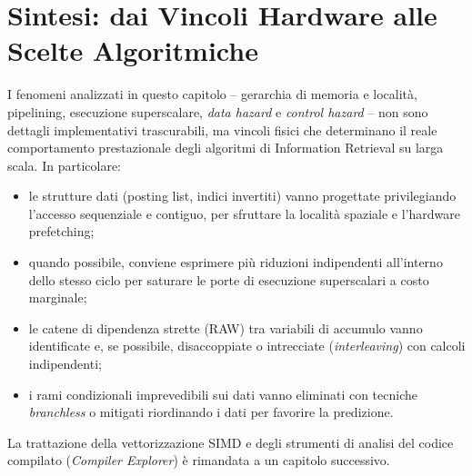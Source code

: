 \FloatBarrier
\section{Sintesi: dai Vincoli Hardware alle Scelte Algoritmiche}

I fenomeni analizzati in questo capitolo -- gerarchia di memoria e localit\`a, pipelining, esecuzione superscalare, \textit{data hazard} e \textit{control hazard} -- non sono dettagli implementativi trascurabili, ma vincoli fisici che determinano il reale comportamento prestazionale degli algoritmi di Information Retrieval su larga scala. In particolare:

\begin{itemize}
    \item le strutture dati (posting list, indici invertiti) vanno progettate privilegiando l'accesso sequenziale e contiguo, per sfruttare la localit\`a spaziale e l'hardware prefetching;
    \item quando possibile, conviene esprimere pi\`u riduzioni indipendenti all'interno dello stesso ciclo per saturare le porte di esecuzione superscalari a costo marginale;
    \item le catene di dipendenza strette (RAW) tra variabili di accumulo vanno identificate e, se possibile, disaccoppiate o intrecciate (\textit{interleaving}) con calcoli indipendenti;
    \item i rami condizionali imprevedibili sui dati vanno eliminati con tecniche \textit{branchless} o mitigati riordinando i dati per favorire la predizione.
\end{itemize}

La trattazione della vettorizzazione SIMD e degli strumenti di analisi del codice compilato (\textit{Compiler Explorer}) \`e rimandata a un capitolo successivo.
